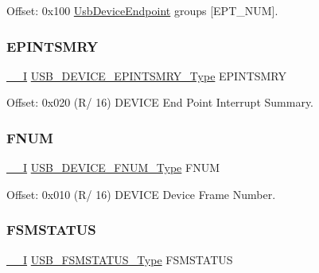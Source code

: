 Offset\+: 0x100 \mbox{\hyperlink{struct_usb_device_endpoint}{Usb\+Device\+Endpoint}} groups \mbox{[}E\+P\+T\+\_\+\+N\+UM\mbox{]}. 

\mbox{\label{struct_usb_device_ab82d39ece90a8a9b80e0952a599bfdd9}} 
\subsubsection{\texorpdfstring{EPINTSMRY}{EPINTSMRY}}
{\footnotesize\ttfamily \mbox{\hyperlink{core__cm0plus_8h_af63697ed9952cc71e1225efe205f6cd3}{\+\_\+\+\_\+I}} \mbox{\hyperlink{union_u_s_b___d_e_v_i_c_e___e_p_i_n_t_s_m_r_y___type}{U\+S\+B\+\_\+\+D\+E\+V\+I\+C\+E\+\_\+\+E\+P\+I\+N\+T\+S\+M\+R\+Y\+\_\+\+Type}} E\+P\+I\+N\+T\+S\+M\+RY}



Offset\+: 0x020 (R/ 16) D\+E\+V\+I\+CE End Point Interrupt Summary. 

\mbox{\label{struct_usb_device_a08a6bd7c8e060195bdeeec9d2355384a}} 
\subsubsection{\texorpdfstring{FNUM}{FNUM}}
{\footnotesize\ttfamily \mbox{\hyperlink{core__cm0plus_8h_af63697ed9952cc71e1225efe205f6cd3}{\+\_\+\+\_\+I}} \mbox{\hyperlink{union_u_s_b___d_e_v_i_c_e___f_n_u_m___type}{U\+S\+B\+\_\+\+D\+E\+V\+I\+C\+E\+\_\+\+F\+N\+U\+M\+\_\+\+Type}} F\+N\+UM}



Offset\+: 0x010 (R/ 16) D\+E\+V\+I\+CE Device Frame Number. 

\mbox{\label{struct_usb_device_a96bd1d241ecd0cfafc7b234d2d76f769}} 
\subsubsection{\texorpdfstring{FSMSTATUS}{FSMSTATUS}}
{\footnotesize\ttfamily \mbox{\hyperlink{core__cm0plus_8h_af63697ed9952cc71e1225efe205f6cd3}{\+\_\+\+\_\+I}} \mbox{\hyperlink{union_u_s_b___f_s_m_s_t_a_t_u_s___type}{U\+S\+B\+\_\+\+F\+S\+M\+S\+T\+A\+T\+U\+S\+\_\+\+Type}} F\+S\+M\+S\+T\+A\+T\+US}



